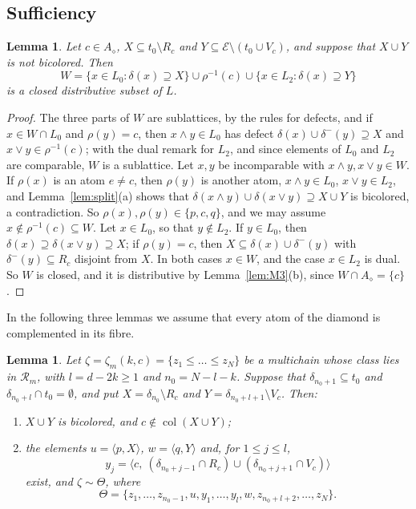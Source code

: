 \documentclass{amsart}
\newtheorem{lemma}[theorem]{Lemma}
\theoremstyle{definition}
\DeclareMathOperator{\col}{col}
\newcommand{\cE}{\mathcal E}
\newcommand{\dm}{\diamond}
\begin{document}
\subsection{Sufficiency}\label{subsec:suff}

\begin{lemma}\label{lem:W}
Let $c\in A_\dm$, $X\subseteq t_0\setminus R_c$ and $Y\subseteq\cE\setminus(t_0\cup V_c)$, and suppose that $X\cup Y$ is not bicolored. Then
\[
W=\{x\in L_0 : \delta(x)\supseteq X\}\cup\rho^{-1}(c)\cup\{x\in L_2 : \delta(x)\supseteq Y\}
\]
is a closed distributive subset of $L$.
\end{lemma}

\begin{proof}
The three parts of $W$ are sublattices, by the rules for defects, and if $x\in W\cap L_0$ and $\rho(y)=c$, then $x\wedge y\in L_0$ has defect $\delta(x)\cup\delta^-(y)\supseteq X$ and $x\vee y\in\rho^{-1}(c)$; with the dual remark for $L_2$, and since elements of $L_0$ and $L_2$ are comparable, $W$ is a sublattice. Let $x,y$ be incomparable with $x\wedge y,x\vee y\in W$. If $\rho(x)$ is an atom $e\ne c$, then $\rho(y)$ is another atom, $x\wedge y\in L_0$, $x\vee y\in L_2$, and Lemma~\ref{lem:split}(a) shows that $\delta(x\wedge y)\cup\delta(x\vee y)\supseteq X\cup Y$ is bicolored, a contradiction. So $\rho(x),\rho(y)\in\{p,c,q\}$, and we may assume $x\notin\rho^{-1}(c)\subseteq W$. Let $x\in L_0$, so that $y\notin L_2$. If $y\in L_0$, then $\delta(x)\supseteq\delta(x\vee y)\supseteq X$; if $\rho(y)=c$, then $X\subseteq\delta(x)\cup\delta^-(y)$ with $\delta^-(y)\subseteq R_c$ disjoint from $X$. In both cases $x\in W$, and the case $x\in L_2$ is dual. So $W$ is closed, and it is distributive by Lemma~\ref{lem:M3}(b), since $W\cap A_\dm=\{c\}$.
\end{proof}

In the following three lemmas we assume that every atom of the diamond is complemented in its fibre.

\begin{lemma}\label{lem:transfer}
Let $\zeta=\zeta_m(k,c)=\{z_1\le\dots\le z_N\}$ be a multichain whose class lies in $\mathcal R_m$, with $l=d-2k\ge1$ and $n_0=N-l-k$. Suppose that $\delta_{n_0+1}\subseteq t_0$ and $\delta_{n_0+l}\cap t_0=\emptyset$, and put $X=\delta_{n_0}\setminus R_c$ and $Y=\delta_{n_0+l+1}\setminus V_c$. Then:
\begin{enumerate}
\item[(a)] $X\cup Y$ is bicolored, and $c\notin\col(X\cup Y)$;
\item[(b)] the elements $u=\langle p,X\rangle$, $w=\langle q,Y\rangle$ and, for $1\le j\le l$,
\[
y_j=\bigl\langle c,\ (\delta_{n_0+j-1}\cap R_c)\cup(\delta_{n_0+j+1}\cap V_c)\bigr\rangle
\]
exist, and $\zeta\sim\Theta$, where
\[
\Theta=\{z_1,\dots,z_{n_0-1},u,y_1,\dots,y_l,w,z_{n_0+l+2},\dots,z_N\}.
\]
\end{enumerate}
\end{lemma}
\end{document}
